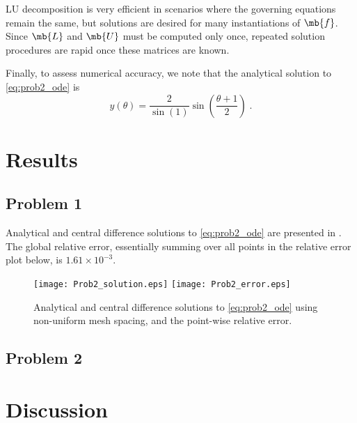 \documentclass[11pt]{article}
\begin{document}
LU decomposition is very efficient in scenarios where the governing equations remain the same, but solutions are desired for many instantiations of $\mb{f}$. Since $\mb{L}$ and $\mb{U}$ must be computed only once, repeated solution procedures are rapid once these matrices are known.

Finally, to assess numerical accuracy, we note that the analytical solution to \eqref{eq:prob2_ode} is
\begin{equation}
y(\theta) = \frac{2}{\sin(1)} \sin \left( \frac{\theta + 1}{2} \right)
\;.
\end{equation}

\section{Results} %

\subsection{Problem 1}

Analytical and central difference solutions to \eqref{eq:prob2_ode} are presented in . The global relative error, essentially summing over all points in the relative error plot below, is $1.61 \times 10^{-3}$.

\begin{figure}[h!]
\begin{center}
\texttt{[image: Prob2\_solution.eps]}
\texttt{[image: Prob2\_error.eps]}
\\[-0.5cm]
\caption{Analytical and central difference solutions to \eqref{eq:prob2_ode} using non-uniform mesh spacing, and the point-wise relative error.}
\label{fig:Prob2}
\end{center}
\end{figure}

\subsection{Problem 2}

\section{Discussion} %
\end{document}

